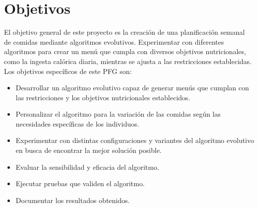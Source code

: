 \section{Objetivos}
\label{ch:objetivos}

El objetivo general de este proyecto es la creación de una planificación semanal de comidas mediante algoritmos evolutivos. Experimentar con diferentes algoritmos para crear un menú que cumpla con diversos objetivos nutricionales, como la ingesta calórica diaria, mientras se ajusta a las restricciones establecidas. Los objetivos específicos de este PFG son:

\begin{itemize}
    \item Desarrollar un algoritmo evolutivo capaz de generar menús que cumplan con las restricciones y los objetivos nutricionales establecidos.
    \item Personalizar el algoritmo para la variación de las comidas según las necesidades específicas de los individuos.
    \item Experimentar con distintas configuraciones y variantes del algoritmo evolutivo en busca de encontrar la mejor solución posible.
    \item Evaluar la sensibilidad y eficacia del algoritmo.
    \item Ejecutar pruebas que validen el algoritmo.
    \item Documentar los resultados obtenidos.
\end{itemize}

